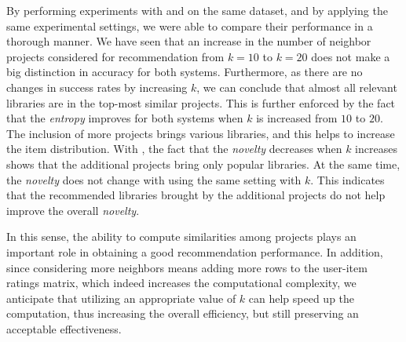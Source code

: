 




By performing experiments with \LR and \CR on the same dataset, and by applying the same experimental settings, we were able to compare their performance in a thorough manner. We have seen that an increase in the number of neighbor projects considered for recommendation from $k=10$ to $k=20$ does not make a big distinction in accuracy for both systems. Furthermore, as there are no changes in success rates by increasing $k$, we can conclude that almost all relevant libraries are in the top-most similar projects. This is further enforced by the fact that the \emph{entropy} improves for both systems when $k$ is increased from $10$ to $20$. The inclusion of more projects brings various libraries, and this  helps to increase the item distribution. With \LR, the fact that the \emph{novelty} decreases when $k$ increases shows that the additional projects bring only popular libraries. At the same time, the \emph{novelty} does not change with \CR using the same setting with $k$. This indicates that the recommended libraries brought by the additional projects do not help improve the overall \emph{novelty}.  

In this sense, the ability to compute similarities among projects plays an important role in obtaining a good recommendation performance. In addition, since considering more neighbors means adding more rows to the user-item ratings matrix, which indeed increases the computational complexity, we anticipate that utilizing an appropriate value of $k$ can help speed up the computation, thus increasing the overall efficiency, but still preserving an acceptable effectiveness.

